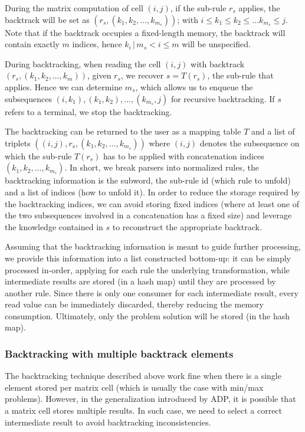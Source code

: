 	\ule
	\item During the matrix computation of cell $(i,j)$, if the sub-rule $r_s$ applies, the backtrack will be set as $(r_s,(k_1,k_2,\ldots,k_{m_s}))$; with $i\le k_1\le k_2\le \ldots k_{m_s}\le j$. Note that if the backtrack occupies a fixed-length memory, the backtrack will contain exactly $m$ indices, hence $k_i\,|\,m_s<i\le m$ will be unspecified.
	\item During backtracking, when reading the cell $(i,j)$ with backtrack $(r_s,(k_1,k_2,\ldots,k_m))$, given $r_s$, we recover $s=T(r_s)$, the sub-rule that applies. Hence we can determine $m_s$, which allows us to enqueue the subsequences $(i,k_1), (k_1,k_2), ..., (k_{m_s},j)$ for recursive backtracking. If $s$ refers to a terminal, we stop the backtracking.
	\item The backtracking can be returned to the user as a mapping table $T$ and a list of triplets $((i,j),r_s,(k_1,k_2,\ldots,k_{m_s}))$ where $(i,j)$ denotes the subsequence on which the sub-rule $T(r_s)$ has to be applied with concatenation indices $(k_1,k_2,\ldots,k_{m_s})$.
\ole
In short, we break parsers into normalized rules, the backtracking information is the subword, the sub-rule id (which rule to unfold) and a list of indices (how to unfold it).
\ule
In order to reduce the storage required by the backtracking indices, we can avoid storing fixed indices (where at least one of the two subsequences involved in a concatenation has a fixed size) and leverage the knowledge contained in $s$ to reconstruct the appropriate backtrack.

Assuming that the backtracking information is meant to guide further processing, we provide this information into a list constructed bottom-up: it can be simply processed in-order, applying for each rule the underlying transformation, while intermediate results are stored (in a hash map) until they are processed by another rule. Since there is only one consumer for each intermediate result, every read value can be immediately discarded, thereby reducing the memory consumption. Ultimately, only the problem solution will be stored (in the hash map).

\subsubsection{Backtracking with multiple backtrack elements}
The backtracking technique described above work fine when there is a single element stored per matrix cell (which is usually the case with min/max problems). However, in the generalization introduced by ADP, it is possible that a matrix cell stores multiple results. In such case, we need to select a correct intermediate result to avoid backtracking inconsistencies.

